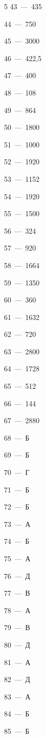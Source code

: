 \documentclass[12pt]{article}
\begin{document}
\begin{multicols}{5}
\mbox{43~--- 435}\par
\mbox{44~--- 750}\par
\mbox{45~--- 3000}\par
\mbox{46~--- 422,5}\par
\mbox{47~--- 400}\par
\mbox{48~--- 108}\par
\mbox{49~--- 864}\par
\mbox{50~--- 1800}\par
\mbox{51~--- 1000}\par
\mbox{52~--- 1920}\par
\mbox{53~--- 1152}\par
\mbox{54~--- 1920}\par
\mbox{55~--- 1500}\par
\mbox{56~--- 324}\par
\mbox{57~--- 920}\par
\mbox{58~--- 1664}\par
\mbox{59~--- 1350}\par
\mbox{60~--- 360}\par
\mbox{61~--- 1632}\par
\mbox{62~--- 720}\par
\mbox{63~--- 2800}\par
\mbox{64~--- 1728}\par
\mbox{65~--- 512}\par
\mbox{66~--- 144}\par
\mbox{67~--- 2880}\par
\mbox{68~--- Б}\par
\mbox{69~--- Б}\par
\mbox{70~--- Г}\par
\mbox{71~--- Б}\par
\mbox{72~--- Б}\par
\mbox{73~--- А}\par
\mbox{74~--- Б}\par
\mbox{75~--- А}\par
\mbox{76~--- Д}\par
\mbox{77~--- В}\par
\mbox{78~--- А}\par
\mbox{79~--- В}\par
\mbox{80~--- Д}\par
\mbox{81~--- А}\par
\mbox{82~--- Д}\par
\mbox{83~--- А}\par
\mbox{84~--- Б}\par
\mbox{85~--- Б}\par

\end{multicols}
\end{document}
